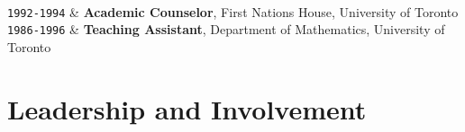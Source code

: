 \documentclass[9pt,a4paper]{article}
\newcommand{\Duration}[2]{\fontsize{10pt}{0}\selectfont \texttt{#1-#2}}
\begin{document}
\begin{EntriesTableDuration}
  \\
  \Duration{1992}{1994} & \textbf{Academic Counselor}, First Nations
  House, University of Toronto
  \\
  \Duration{1986}{1996} & \textbf{Teaching Assistant}, Department of
  Mathematics, University of Toronto
\end{EntriesTableDuration}


\section{Leadership and Involvement}
\end{document}
